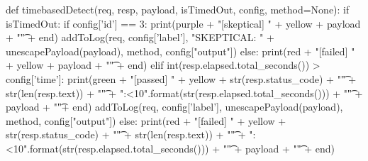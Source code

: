 \begin{python}
def timebasedDetect(req, resp, payload, isTimedOut, config, method=None):
    if isTimedOut:
        if config['id'] == 3:
            print(purple + "[skeptical]    " + yellow + payload + "\t" + end)
            addToLog(req, config['label'], "SKEPTICAL: " + unescapePayload(payload), method, config["output"])
    else:
        print(red + "[failed]    " + yellow + payload + "\t" +  end)
    elif int(resp.elapsed.total_seconds()) > config['time']:
        print(green + "[passed]    " + yellow + str(resp.status_code) + "\t" + str(len(resp.text)) + "\t" + "{:<10}".format(str(resp.elapsed.total_seconds())) + "\t" +  payload + "\t"+ end)
        addToLog(req, config['label'], unescapePayload(payload), method, config["output"])
    else:
        print(red + "[failed]    " + yellow + str(resp.status_code) + "\t" + str(len(resp.text)) + "\t" + "{:<10}".format(str(resp.elapsed.total_seconds())) + "\t" +  payload + "\t" +  end)
\end{python}
